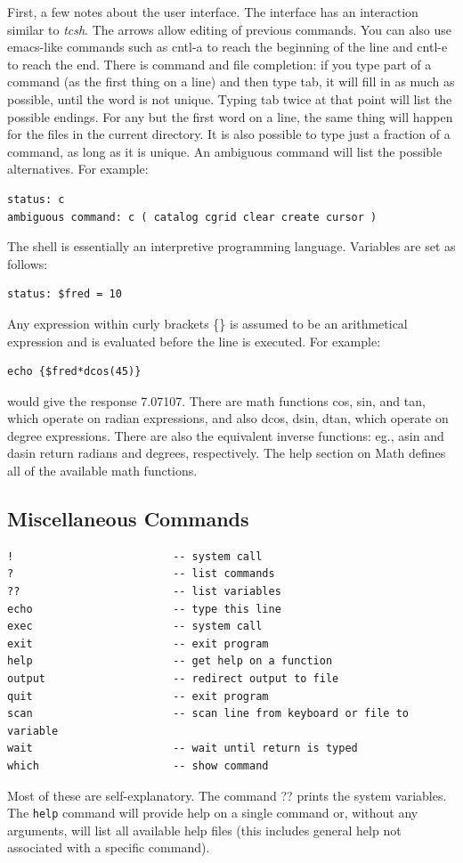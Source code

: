\documentclass{article}
\newcommand\pr{\em}                   %
\begin{document}
First, a few notes about the user interface.  The interface has an
interaction similar to {\pr tcsh}.  The arrows allow editing of
previous commands.  You can also use emacs-like commands such as
cntl-a to reach the beginning of the line and cntl-e to reach the end.
There is command and file completion: if you type part of a command
(as the first thing on a line) and then type tab, it will fill in as
much as possible, until the word is not unique.  Typing tab twice at
that point will list the possible endings.  For any but the first word
on a line, the same thing will happen for the files in the current
directory.  It is also possible to type just a fraction of a command,
as long as it is unique.  An ambiguous command will list the possible
alternatives.  For example:
\begin{verbatim}
status: c
ambiguous command: c ( catalog cgrid clear create cursor )
\end{verbatim}

The shell is essentially an interpretive programming language.
Variables are set as follows:
\begin{verbatim}
status: $fred = 10
\end{verbatim}
Any expression within curly brackets \{\} is assumed
to be an arithmetical expression and is evaluated before the line is
executed.  For example:
\begin{verbatim}
echo {$fred*dcos(45)}
\end{verbatim}
would give the response 7.07107.  There are math functions cos, sin,
and tan, which operate on radian expressions, and also dcos, dsin,
dtan, which operate on degree expressions.  There are also the
equivalent inverse functions: eg., asin and dasin return radians and
degrees, respectively.  The help section on Math defines all of the
available math functions.  

\subsection{Miscellaneous Commands}
\begin{verbatim}
!                         -- system call
?                         -- list commands 
??                        -- list variables 
echo                      -- type this line 
exec                      -- system call
exit                      -- exit program 
help                      -- get help on a function 
output                    -- redirect output to file
quit                      -- exit program 
scan                      -- scan line from keyboard or file to variable 
wait                      -- wait until return is typed
which                     -- show command 
\end{verbatim}
Most of these are self-explanatory.  The command ?? prints the system
variables.  The {\tt help} command will provide help on a single
command or, without any arguments, will list all available help
files (this includes general help not associated with a specific
command).  
\end{document}
